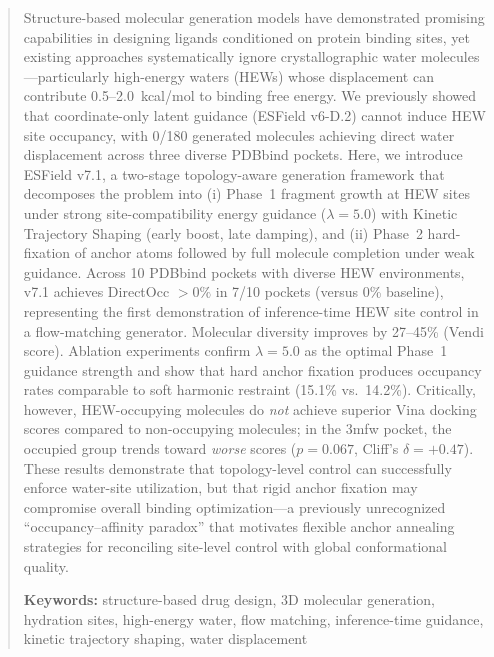 \documentclass[11pt,letterpaper]{article}
\begin{document}
\begin{abstract}
Structure-based molecular generation models have demonstrated promising
capabilities in designing ligands conditioned on protein binding sites, yet
existing approaches systematically ignore crystallographic water
molecules---particularly high-energy waters (HEWs) whose displacement can
contribute 0.5--2.0~kcal/mol to binding free energy.  We previously showed
that coordinate-only latent guidance (ESField v6-D.2) cannot induce HEW site
occupancy, with 0/180 generated molecules achieving direct water displacement
across three diverse PDBbind pockets.  Here, we introduce ESField v7.1, a
two-stage topology-aware generation framework that decomposes the problem into
(i) Phase~1 fragment growth at HEW sites under strong site-compatibility energy
guidance ($\lambda=5.0$) with Kinetic Trajectory Shaping (early boost, late
damping), and (ii) Phase~2 hard-fixation of anchor atoms followed by full
molecule completion under weak guidance.  Across 10 PDBbind pockets with diverse
HEW environments, v7.1 achieves DirectOcc $> 0\%$ in 7/10 pockets (versus 0\%
baseline), representing the first demonstration of inference-time HEW site
control in a flow-matching generator.  Molecular diversity improves by
27--45\% (Vendi score).  Ablation experiments confirm $\lambda=5.0$ as the
optimal Phase~1 guidance strength and show that hard anchor fixation produces
occupancy rates comparable to soft harmonic restraint (15.1\% vs.\ 14.2\%).
Critically, however, HEW-occupying molecules do \emph{not} achieve superior
Vina docking scores compared to non-occupying molecules; in the 3mfw pocket,
the occupied group trends toward \emph{worse} scores ($p=0.067$, Cliff's
$\delta=+0.47$).  These results demonstrate that topology-level control can
successfully enforce water-site utilization, but that rigid anchor fixation may
compromise overall binding optimization---a previously unrecognized
``occupancy--affinity paradox'' that motivates flexible anchor annealing
strategies for reconciling site-level control with global conformational
quality.

\medskip
\noindent\textbf{Keywords:} structure-based drug design, 3D molecular
generation, hydration sites, high-energy water, flow matching, inference-time
guidance, kinetic trajectory shaping, water displacement
\end{abstract}

\end{document}

